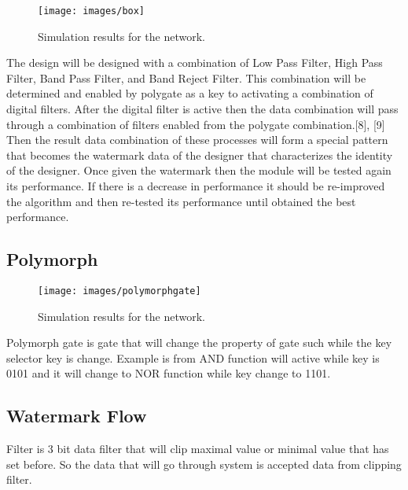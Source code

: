 \documentclass[10pt,journal,compsoc]{IEEEtran}
\begin{document}
\begin{figure}[h]
	\centering
	\texttt{[image: images/box]}
	\caption{Simulation results for the network.}
	\label{fig_sim}
\end{figure}

The design will be designed with a combination of Low Pass Filter, High Pass Filter, Band Pass Filter, and Band Reject Filter. This combination will be determined and enabled by polygate as a key to activating a combination of digital filters. After the digital filter is active then the data combination will pass through a combination of filters enabled from the polygate combination.[8], [9] Then the result data combination of these processes will form a special pattern that becomes the watermark data of the designer that characterizes the identity of the designer. Once given the watermark then the module will be tested again its performance. If there is a decrease in performance it should be re-improved the algorithm and then re-tested its performance until obtained the best performance.


\subsection{Polymorph}
\begin{figure}[h]
	\centering
	\texttt{[image: images/polymorphgate]}
	\caption{Simulation results for the network.}
	\label{fig_sim}
\end{figure}

Polymorph gate is gate that will change the property of gate such while the key selector key is change. Example is from AND function will active while key is 0101 and it will change to NOR function while key change to 1101.


\subsection{Watermark Flow}
Filter is 3 bit data filter that will clip maximal value or minimal value that has set before. So the data that will go through system is accepted data from clipping filter.
\end{document}
